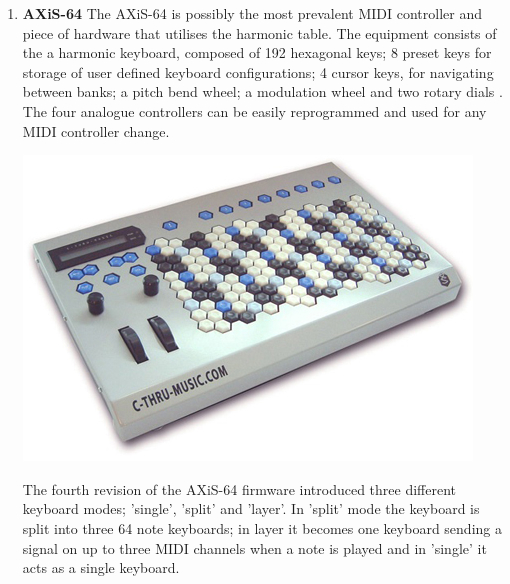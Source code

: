 \documentclass[10pt,a4paper]{article}
\begin{document}
\begin{enumerate}
\item \textbf{AXiS-64}
The AXiS-64 is possibly the most prevalent MIDI controller and piece of hardware that utilises the harmonic table. The equipment consists of the a harmonic keyboard, composed of 192 hexagonal keys; 8 preset keys for storage of user defined keyboard configurations; 4 cursor keys, for navigating between banks; a pitch bend wheel; a modulation wheel and two rotary dials \cite{cthru}. The four analogue controllers can be easily reprogrammed and used for any MIDI controller change.
\begin{center}
\includegraphics[scale=0.5]{4.jpg}
\end{center}
The fourth revision of the AXiS-64 firmware introduced three different keyboard modes; 'single', 'split' and 'layer'.  In 'split' mode the keyboard is split into three 64 note keyboards; in layer it becomes one keyboard sending a signal on up to three MIDI channels when a note is played and in 'single' it acts as a single keyboard.
\end{enumerate}
\end{document}
